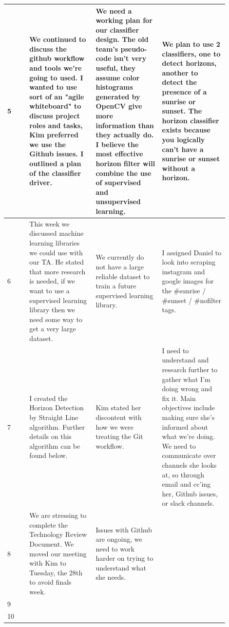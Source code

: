 \documentclass[onecolumn, draftclsnofoot,10pt, compsoc]{IEEEtran}
\begin{document}
\begin{singlespace}
\begin{tabular}{|l|p{0.3\linewidth}|p{0.3\linewidth}|p{0.3\linewidth}|}
		5 	&
			We continued to discuss the github workflow and tools we're going to used.
			I wanted to use sort of an "agile whiteboard" to discuss project roles and tasks, Kim preferred we use the Github issues.
			I outlined a plan of the classifier driver.
			&
			We need a working plan for our classifier design.
			The old team's pseudo-code isn't very useful, they assume color histograms generated by OpenCV give more information than they actually do.
			I believe the most effective horizon filter will combine the use of supervised and unsupervised learning.
			&
			We plan to use 2 classifiers, one to detect horizons, another to detect the presence of a sunrise or sunset.
			The horizon classifier exists because you logically can't have a sunrise or sunset without a horizon.
			\\\hline

		6	&
			This week we discussed machine learning libraries we could use with our TA.
			He stated that more research is needed, if we want to use a supervised learning library then we need some way to get a very large dataset.
			&
			We currently do not have a large reliable dataset to train a future supervised learning library.
			&
			I assigned Daniel to look into scraping instagram and google images for the \#sunrise / \#sunset / \#nofilter tags.
			\\\hline

		7	&
			I created the Horizon Detection by Straight Line algorithm.
			Further details on this algorithm can be found below.
			&
			Kim stated her discontent with how we were treating the Git workflow.
			&
			I need to understand and research further to gather what I'm doing wrong and fix it.
			Main objectives include making sure she's informed about what we're doing. 
			We need to communicate over channels she looks at, so through email and cc'ing her, Github issues, or slack channels.
			\\\hline

		8	&
			We are stressing to complete the Technology Review Document.
			We moved our meeting with Kim to Tuesday, the 28th to avoid finals week.
			&
			Issues with Github are ongoing, we need to work harder on trying to understand what she needs.
			&

			\\\hline

		9	&
			&
			&
			\\\hline

		10	&
			&
			&
			\\\hline
		\end{tabular}\\


\end{singlespace}
\end{document}
